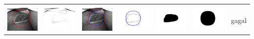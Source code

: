 \begin{table}[H]
\begin{tabular}{|m{0.7in}|m{0.7in}|m{0.7in}|m{0.7in}|m{0.7in}|m{0.7in}|m{0.7in}|}
		&  &  & & & &  \\
		\includegraphics[width=0.7in]{dataset/dataset_3/luka_merah/ready/16_integer_init.jpg}&
		\includegraphics[width=0.7in]{dataset/dataset_3/luka_merah/ready/16_integer_ext.jpg}&
		\includegraphics[width=0.7in]{dataset/dataset_3/luka_merah/ready/16_integer_result.jpg}&
		\includegraphics[width=0.7in]{dataset/dataset_3/luka_merah/ready/16_gt_r_integer.jpg}&
		\includegraphics[width=0.7in]{dataset/dataset_3/luka_merah/ready/16_r.jpg}&
		\includegraphics[width=0.7in]{dataset/dataset_3/luka_merah/ready/16_integer_r.jpg}&
		gagal\\
		\hline
		

\end{tabular}
\end{table}
